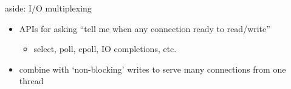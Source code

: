 \begin{frame}{aside: I/O multiplexing}
\begin{itemize}
\item APIs for asking ``tell me when any connection ready to read/write''
    \begin{itemize}
    \item select, poll, epoll, IO completions, etc.
    \end{itemize}
\item combine with `non-blocking' writes to serve many connections from one thread
\end{itemize}
\end{frame}
